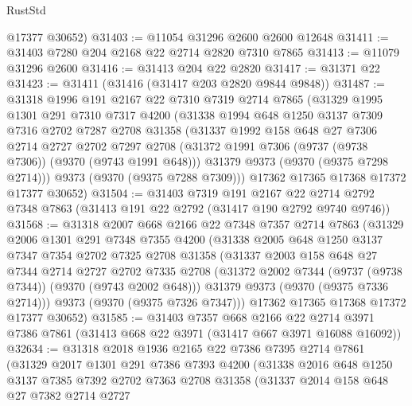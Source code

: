 \begin{lexlean}{RustStd}
\begin{coremodule}
      @17377
      @30652)
@31403 := @11054 @31296 @2600 @2600 @12648
@31411 := @31403 @7280 @204 @2168 @22 @2714 @2820 @7310 @7865
@31413 := @11079 @31296 @2600
@31416 := @31413 @204 @22 @2820
@31417 := @31371 @22
@31423 := @31411 (@31416 (@31417 @203 @2820 @9844 @9848))
@31487 := @31318
    @1996
    @191
    @2167
    @22
    @7310
    @7319
    @2714
    @7865
    (@31329
      @1995
      @1301
      @291
      @7310
      @7317
      @4200
      (@31338
        @1994
        @648
        @1250
        @3137
        @7309
        @7316
        @2702
        @7287
        @2708
        @31358
        (@31337
          @1992
          @158
          @648
          @27
          @7306
          @2714
          @2727
          @2702
          @7297
          @2708
          (@31372 @1991 @7306 (@9737 (@9738 @7306)) (@9370 (@9743 @1991 @648)))
          @31379
          @9373
          (@9370 (@9375 @7298 @2714)))
        @9373
        (@9370 (@9375 @7288 @7309)))
      @17362
      @17365
      @17368
      @17372
      @17377
      @30652)
@31504 := @31403
    @7319
    @191
    @2167
    @22
    @2714
    @2792
    @7348
    @7863
    (@31413 @191 @22 @2792 (@31417 @190 @2792 @9740 @9746))
@31568 := @31318
    @2007
    @668
    @2166
    @22
    @7348
    @7357
    @2714
    @7863
    (@31329
      @2006
      @1301
      @291
      @7348
      @7355
      @4200
      (@31338
        @2005
        @648
        @1250
        @3137
        @7347
        @7354
        @2702
        @7325
        @2708
        @31358
        (@31337
          @2003
          @158
          @648
          @27
          @7344
          @2714
          @2727
          @2702
          @7335
          @2708
          (@31372 @2002 @7344 (@9737 (@9738 @7344)) (@9370 (@9743 @2002 @648)))
          @31379
          @9373
          (@9370 (@9375 @7336 @2714)))
        @9373
        (@9370 (@9375 @7326 @7347)))
      @17362
      @17365
      @17368
      @17372
      @17377
      @30652)
@31585 := @31403
    @7357
    @668
    @2166
    @22
    @2714
    @3971
    @7386
    @7861
    (@31413 @668 @22 @3971 (@31417 @667 @3971 @16088 @16092))
@32634 := @31318
    @2018
    @1936
    @2165
    @22
    @7386
    @7395
    @2714
    @7861
    (@31329
      @2017
      @1301
      @291
      @7386
      @7393
      @4200
      (@31338
        @2016
        @648
        @1250
        @3137
        @7385
        @7392
        @2702
        @7363
        @2708
        @31358
        (@31337
          @2014
          @158
          @648
          @27
          @7382
          @2714
          @2727

\end{coremodule}
\end{lexlean}
